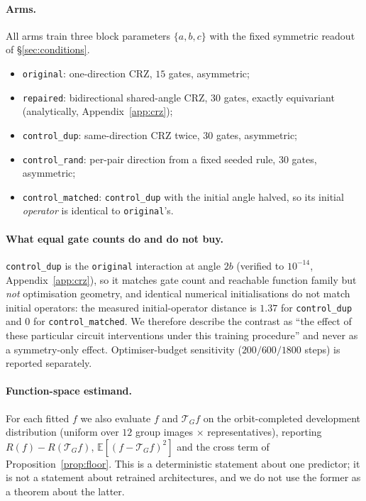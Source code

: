 \documentclass[11pt]{article}
\newcommand{\Tg}{\mathcal{T}_G}
\begin{document}
\paragraph{Arms.} All arms train three block parameters $\{a,b,c\}$ with the fixed
symmetric readout of \S\ref{sec:conditions}.
\begin{itemize}[leftmargin=1.4em,itemsep=1pt,topsep=1pt]
  \item \texttt{original}: one-direction CRZ, $15$ gates, asymmetric;
  \item \texttt{repaired}: bidirectional shared-angle CRZ, $30$ gates, exactly
        equivariant (analytically, Appendix~\ref{app:crz});
  \item \texttt{control\_dup}: same-direction CRZ twice, $30$ gates, asymmetric;
  \item \texttt{control\_rand}: per-pair direction from a fixed seeded rule, $30$ gates,
        asymmetric;
  \item \texttt{control\_matched}: \texttt{control\_dup} with the initial angle halved, so
        its initial \emph{operator} is identical to \texttt{original}'s.
\end{itemize}

\paragraph{What equal gate counts do and do not buy.} \texttt{control\_dup} is the
\texttt{original} interaction at angle $2b$ (verified to $10^{-14}$,
Appendix~\ref{app:crz}), so it matches gate count and reachable function family but
\emph{not} optimisation geometry, and identical numerical initialisations do not match
initial operators: the measured initial-operator distance is $1.37$ for
\texttt{control\_dup} and $0$ for \texttt{control\_matched}. We therefore describe the
contrast as ``the effect of these particular circuit interventions under this training
procedure'' and never as a symmetry-only effect. Optimiser-budget sensitivity
($200/600/1800$ steps) is reported separately.

\paragraph{Function-space estimand.} For each fitted $f$ we also evaluate $f$ and $\Tg f$
on the orbit-completed development distribution (uniform over $12$ group images
$\times$ representatives), reporting $R(f)-R(\Tg f)$, $\mathbb{E}[(f-\Tg f)^2]$ and the
cross term of Proposition~\ref{prop:floor}. This is a deterministic statement about one
predictor; it is not a statement about retrained architectures, and we do not use the
former as a theorem about the latter.
\end{document}
